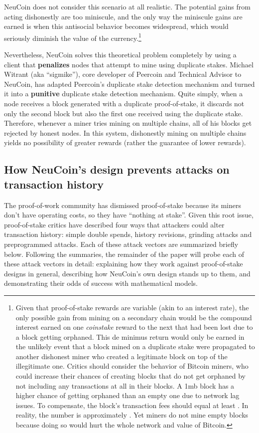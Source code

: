 \documentclass[a4paper,11pt]{article}
\begin{document}
NeuCoin does not consider this scenario at all realistic. The potential gains from acting dishonestly are too miniscule, and the only way the miniscule gains are earned is when this antisocial behavior becomes widespread, which would seriously diminish the value of the currency.\footnote{Given that proof-of-stake rewards are variable (akin to an interest rate), the only possible gain from mining on a secondary chain would be the compound interest earned on one \textit{coinstake} reward to the next that had been lost due to a block getting orphaned. This de minimus return would only be earned in the unlikely event that a block mined on a duplicate stake were propagated to another dishonest miner who created a legitimate block on top of the illegitimate one. Critics should consider the behavior of Bitcoin miners, who could increase their chances of creating blocks that do not get orphaned by not including any transactions at all in their blocks. A 1mb block has a  higher chance of getting orphaned than an empty one due to network lag issues\cite{gavintx}. To compensate, the block's transaction fees should equal at least . In reality, the number is approximately . Yet miners do not mine empty blocks because doing so would hurt the whole network and value of Bitcoin. }

Nevertheless, NeuCoin solves this theoretical problem completely by using a client that \textbf{penalizes} nodes that attempt to mine using duplicate stakes. Michael Witrant (aka ``sigmike''), core developer of Peercoin and Technical Advisor to NeuCoin, has adapted Peercoin's duplicate stake detection mechanism and turned it into a \textbf{punitive} duplicate stake detection mechanism. Quite simply, when a node receives a block generated with a duplicate proof-of-stake, it discards not only the second block but also the first one received using the duplicate stake. Therefore, whenever a miner tries mining on multiple chains, all of his blocks get rejected by honest nodes. In this system, dishonestly mining on multiple chains yields no possibility of greater rewards (rather the guarantee of lower rewards).


\subsection{How NeuCoin's design prevents attacks on transaction history}

The proof-of-work community has dismissed proof-of-stake because its miners don't have operating costs, so they have ``nothing at stake''. Given this root issue, proof-of-stake critics have described four ways that attackers could alter transaction history: simple double spends, history revisions, grinding attacks and preprogrammed attacks. Each of these attack vectors are summarized briefly below. Following the summaries, the remainder of the paper will probe each of these attack vectors in detail: explaining how they work against proof-of-stake designs in general, describing how NeuCoin's own design stands up to them, and demonstrating their odds of success with mathematical models.
\end{document}
